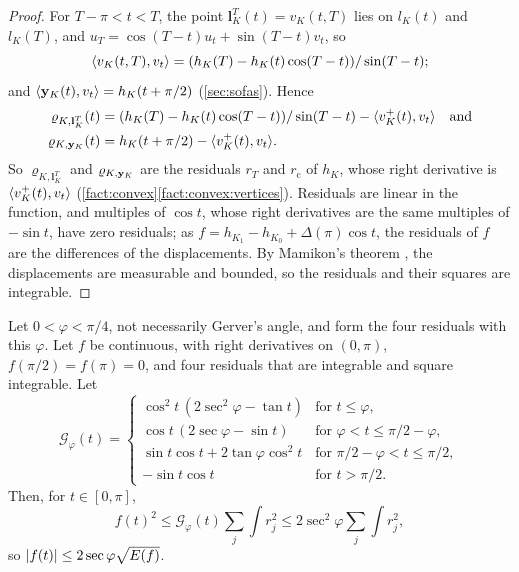 \begin{proof}
For $T-\pi<t<T$, the point $\mathbf l_K^T(t)=v_K(t,T)$ lies on $l_K(t)$ and
$l_K(T)$, and $u_T=\cos(T-t)u_t+\sin(T-t)v_t$, so
\[
  \langle v_K(t,T),v_t\rangle=(h_K(T)-h_K(t)\cos(T-t))/\sin(T-t);
\]
and $\langle \mathbf{y}_K(t),v_t\rangle=h_K(t+\pi/2)$ (\cref{sec:sofas}). Hence
\begin{align*}
  \varrho_{K,\mathbf l_K^T}(t)&=(h_K(T)-h_K(t)\cos(T-t))/\sin(T-t)
    -\langle v^+_K(t),v_t\rangle\quad\text{and}\\
  \varrho_{K,\mathbf{y}_K}(t)&=h_K(t+\pi/2)-\langle v^+_K(t),v_t\rangle.
\end{align*}
So $\varrho_{K,\mathbf l^T_K}$ and $\varrho_{K,\mathbf{y}_K}$ are the residuals $r_T$
and $r_{\mathrm c}$ of $h_K$, whose right derivative is $\langle v^+_K(t),v_t\rangle$
(\cref{fact:convex}\ref{fact:convex:vertices}). Residuals are linear in the
function, and multiples of $\cos t$, whose right derivatives are the same
multiples of $-\sin t$, have zero residuals; as
$f=h_{K_1}-h_{K_0}+\Delta(\pi)\cos t$, the residuals of $f$ are the
differences of the displacements. By Mamikon's theorem , the
displacements are measurable and bounded, so the residuals and their squares
are integrable.
\end{proof}

\begin{proposition}\label{prop:stab-coercive}
Let $0<\varphi<\pi/4$, not necessarily Gerver's angle, and form the four
residuals with this $\varphi$. Let $f$ be continuous, with right derivatives on
$(0,\pi)$, $f(\pi/2)=f(\pi)=0$, and four residuals that are integrable and
square integrable. Let
\[
  \mathcal G_\varphi(t)=
  \begin{cases}
    \cos^2t\,(2\sec^2\varphi-\tan t) & \text{for }t\le\varphi,\\
    \cos t\,(2\sec\varphi-\sin t) & \text{for }\varphi<t\le\pi/2-\varphi,\\
    \sin t\cos t+2\tan\varphi\cos^2t & \text{for }\pi/2-\varphi<t\le\pi/2,\\
    -\sin t\cos t & \text{for }t>\pi/2.
  \end{cases}
\]
Then, for $t\in[0,\pi]$,
\[
  f(t)^2\le\mathcal G_\varphi(t)\sum_j\int r_j^2\le2\sec^2\varphi\sum_j\int r_j^2,
\]
so $\lvert f(t)\rvert\le2\sec\varphi\sqrt{E(f)}$.
\end{proposition}

